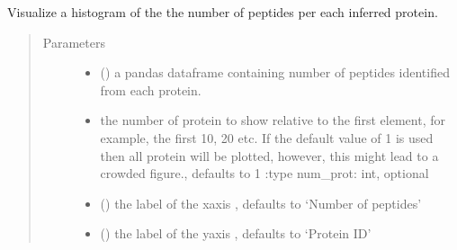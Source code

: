 \documentclass[letterpaper,10pt,english]{sphinxmanual}
\begin{document}
\begin{fulllineitems}
\label{\detokenize{IPTK.Visualization:IPTK.Visualization.vizTools.plotly_num_peptides_per_parent}}
Visualize a histogram of the the number of peptides per each inferred protein.
\begin{quote}\begin{description}
\item[{Parameters}] \leavevmode\begin{itemize}
\item {} 
 () \textendash{} a pandas dataframe containing number of peptides identified from each protein.

\item {} 
 \textendash{} the number of protein to show relative to the first element, for example, the first 10, 20 etc.     If the default value of \sphinxhyphen{}1 is used then all protein will be plotted, however, this might lead to a crowded figure., defaults to \sphinxhyphen{}1    :type num\_prot: int, optional

\item {} 
 (\sphinxstyleliteralemphasis{\sphinxupquote{, }}) \textendash{} the label of the x\sphinxhyphen{}axis , defaults to ‘Number of peptides’

\item {} 
 (\sphinxstyleliteralemphasis{\sphinxupquote{, }}) \textendash{} the label of the y\sphinxhyphen{}axis , defaults to ‘Protein ID’


\end{itemize}
\end{description}
\end{quote}
\end{fulllineitems}
\end{document}
